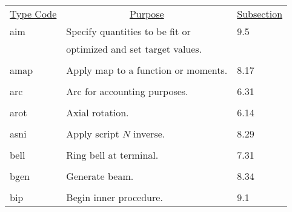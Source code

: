 \begin{center}
\begin{tabular}{lll}
\multicolumn{1}{c}{\underline {Type Code}} &
\multicolumn{1}{c}{\underline{Purpose}}   &
\multicolumn{1}{c}{\underline{Subsection}} \\
\hspace{1.5em}aim  &  Specify quantities to be fit or  &  \hspace{2em}9.5\\
           &   optimized and set target values. &\\
\vspace{-3mm}& &\\
\hspace{1.5em}amap  &  Apply map to a function or moments.  &   \hspace{2em}8.17\\
\vspace{-3mm}& &\\
\hspace{1.5em}arc  &  Arc for accounting purposes.  &   \hspace{2em}6.31\\
\vspace{-3mm}& &\\
\hspace{1.5em}arot  &  Axial rotation.                      &  \hspace{2em}6.14\\
\vspace{-3mm}& &\\
\hspace{1.5em}asni  &    Apply script $N$ inverse.     &   \hspace{2em}8.29\\
\vspace{-3mm}& &\\
\hspace{1.5em}bell  &   Ring bell at terminal.               & \hspace{2em}7.31\\
\vspace{-3mm}& &\\
\hspace{1.5em}bgen  &        Generate beam.     &   \hspace{2em}8.34\\
\vspace{-3mm}& &\\
\hspace{1.5em}bip  &  Begin inner procedure.            &       \hspace{2em}9.1\\

\end{tabular}
\end{center}
